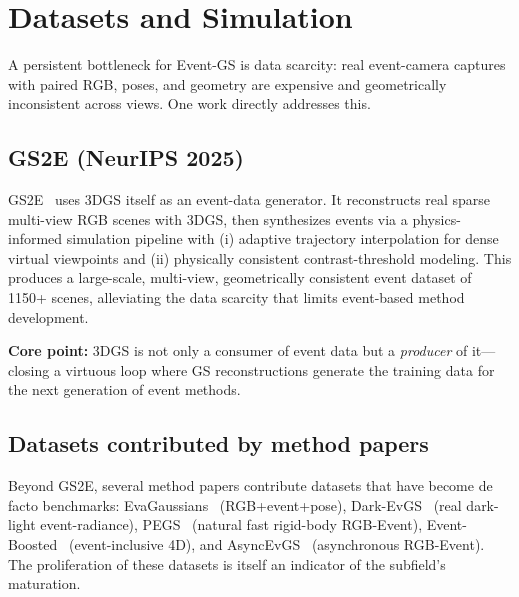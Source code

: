 \section{Datasets and Simulation}
\label{sec:datasets}

A persistent bottleneck for Event-GS is data scarcity: real event-camera captures with paired RGB, poses, and geometry are expensive and geometrically inconsistent across views. One work directly addresses this.

\subsection{GS2E (NeurIPS 2025)}
\label{sec:datasets:gs2e}

GS2E~\cite{li2025gs2e} uses 3DGS itself as an event-data generator. It reconstructs real sparse multi-view RGB scenes with 3DGS, then synthesizes events via a physics-informed simulation pipeline with (i) adaptive trajectory interpolation for dense virtual viewpoints and (ii) physically consistent contrast-threshold modeling. This produces a large-scale, multi-view, geometrically consistent event dataset of 1150+ scenes, alleviating the data scarcity that limits event-based method development.

\textbf{Core point:} 3DGS is not only a consumer of event data but a \emph{producer} of it---closing a virtuous loop where GS reconstructions generate the training data for the next generation of event methods.

\subsection{Datasets contributed by method papers}

Beyond GS2E, several method papers contribute datasets that have become de facto benchmarks: EvaGaussians~\cite{yu2025evagaussians} (RGB+event+pose), Dark-EvGS~\cite{wu2025darkevgs} (real dark-light event-radiance), PEGS~\cite{xu2025pegs} (natural fast rigid-body RGB-Event), Event-Boosted~\cite{xu2025eventboosted} (event-inclusive 4D), and AsyncEvGS~\cite{dai2026asyncevgs} (asynchronous RGB-Event). The proliferation of these datasets is itself an indicator of the subfield's maturation.
